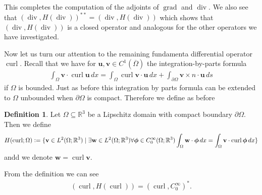 \documentclass[12pt,a4paper]{article}
\numberwithin{equation}{subsection}
\numberwithin{lemma}{subsection}
\theoremstyle{definition}
\newtheorem{definition}[lemma]{Definition}
\DeclareMathOperator{\curl}{curl}
\DeclareMathOperator{\diver}{div}
\DeclareMathOperator{\grad}{grad}
\newcommand{\real}{\mathbb{R}}
\begin{document}


This completes the computation of the adjoints of $\grad$ and $\diver$. We also 
see that $(\diver, H(\diver))^{**} = (\diver, H(\diver))$ which shows that 
$ (\diver, H(\diver))$ is a closed operator and analogous for the other operators 
we have investigated.

Now let us turn our attention to the remaining fundamenta differential operator 
$\curl$. Recall that we have for 
$\mathbf{u}, \mathbf{v} \in C^1(\overline{\Omega})$ the integration-by-parts 
formula
\begin{align}
    \int_\Omega \mathbf{v} \cdot \curl \mathbf{u} \, dx 
    = \int_\Omega \curl \mathbf{v} \cdot \mathbf{u} \, dx 
        + \int_{\partial \Omega} \mathbf{v} \times n \cdot \mathbf{u} \, ds 
        \label{eq:integration_by_parts_curl_C1} 
\end{align}
if $\Omega$ is bounded. Just as before this integration by parts formula can 
be extended to $\Omega$ unbounded when $\partial \Omega$ is compact. 
Therefore we define as before 
\begin{definition}
    Let $\Omega \subseteq \real^3$ be a Lipschitz domain with compact boundary $\partial \Omega$. 
    Then we define 
    \begin{align*}
        H(\curl;\Omega) \vcentcolon= \{ \mathbf{v} \in L^2(\Omega;\real^3)
        \mid \exists \mathbf{w} \in L^2(\Omega; \real^3) 
        \forall \boldsymbol{\phi} \in C_0^\infty(\Omega;\real^3)
        \int_\Omega \mathbf{w} \cdot \boldsymbol{\phi} \, dx 
        = \int_\Omega \mathbf{v} \cdot \curl \boldsymbol{\phi} \, dx \}
    \end{align*}
    andd we denote $\mathbf{w} = \curl \mathbf{v}$.
\end{definition}
From the definition we can see
\begin{align*}
    (\curl, H(\curl)) = (\curl, C_0^\infty)^*.
\end{align*}
\end{document}
